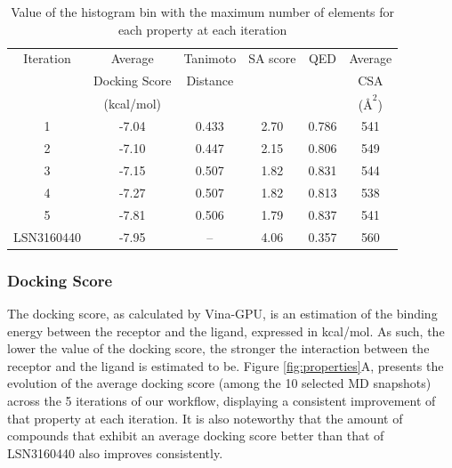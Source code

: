 \begin{table}[H]
  \caption{Value of the histogram bin with the maximum number of elements for each property at each iteration}
  \label{tab:hist_bin_center}
  \centering
  \begin{tabular}{cccccc}
    \hline
    Iteration            & Average       & Tanimoto & SA score & QED   & Average            \\
                         & Docking Score & Distance &          &       & CSA                \\
                         & (kcal/mol)    &          &          &       & ($\text{\AA}^{2}$) \\
    \hline
    1                    & -7.04         & 0.433    & 2.70     & 0.786 & 541                \\
    2                    & -7.10         & 0.447    & 2.15     & 0.806 & 549                \\
    3                    & -7.15         & 0.507    & 1.82     & 0.831 & 544                \\
    4                    & -7.27         & 0.507    & 1.82     & 0.813 & 538                \\
    5                    & -7.81         & 0.506    & 1.79     & 0.837 & 541                \\
    \hline
    LSN3160440                  & -7.95         & --       & 4.06     & 0.357 & 560                \\
    \hline
  \end{tabular}
\end{table}

\subsubsection{Docking Score}\label{sec:results-docking_score}
The docking score, as calculated by Vina-GPU, is an estimation of the binding energy between the receptor and the ligand, expressed in kcal/mol. As such, the lower the value of the docking score, the stronger the interaction between the receptor and the ligand is estimated to be. Figure \ref{fig:properties}A, presents the evolution of the average docking score (among the 10 selected MD snapshots) across the 5 iterations of our workflow, displaying a consistent improvement of that property at each iteration. It is also noteworthy that the amount of compounds that exhibit an average docking score better than that of LSN3160440 also improves consistently.

